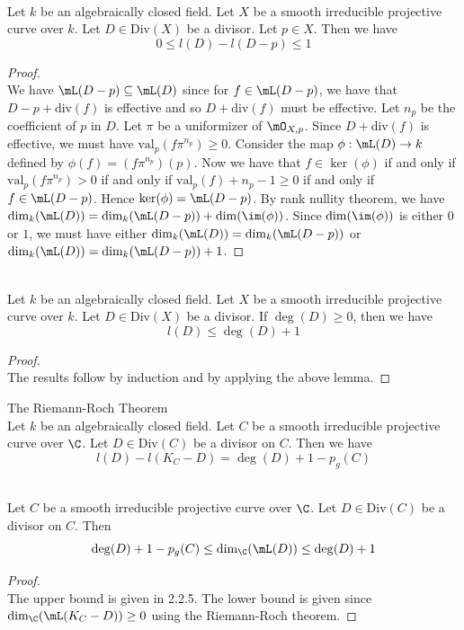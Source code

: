 \documentclass[a4paper]{article}
\begin{document}
\begin{lmm}{}{}\\
Let $k$ be an algebraically closed field. Let $X$ be a smooth irreducible projective curve over $k$. Let $D\in\text{Div}(X)$ be a divisor. Let $p\in X$. Then we have $$0\leq l(D)-l(D-p)\leq 1$$
\begin{proof}\\
We have $\mL(D-p)\subseteq\mL(D)$ since for $f\in\mL(D-p)$, we have that $D-p+\text{div}(f)$ is effective and so $D+\text{div}(f)$ must be effective. Let $n_p$ be the coefficient of $p$ in $D$. Let $\pi$ be a uniformizer of $\mO_{X,p}$. Since $D+\text{div}(f)$ is effective, we must have $\text{val}_p(f\pi^{n_p})\geq 0$. Consider the map $\phi:\mL(D)\to k$ defined by $\phi(f)=(f\pi^{n_p})(p)$. Now we have that $f\in\ker(\phi)$ if and only if $\text{val}_p(f\pi^{n_p})>0$ if and only if $\text{val}_p(f)+n_p-1\geq 0$ if and only if $f\in\mL(D-p)$. Hence $\ker(\phi)=\mL(D-p)$. By rank nullity theorem, we have $\dim_k(\mL(D))=\dim_k(\mL(D-p))+\dim(\im(\phi))$. Since $\dim(\im(\phi))$ is either $0$ or $1$, we must have either $\dim_k(\mL(D))=\dim_k(\mL(D-p))$ or $\dim_k(\mL(D))=\dim_k(\mL(D-p))+1$. 
\end{proof}
\end{lmm}

\begin{prp}{}{}\\
Let $k$ be an algebraically closed field. Let $X$ be a smooth irreducible projective curve over $k$. Let $D\in\text{Div}(X)$ be a divisor. If $\deg(D)\geq 0$, then we have $$l(D)\leq\deg(D)+1$$
\begin{proof}\\
The results follow by induction and by applying the above lemma. 
\end{proof}
\end{prp}

\begin{thm}{The Riemann-Roch Theorem}{}\\
Let $k$ be an algebraically closed field. Let $C$ be a smooth irreducible projective curve over $\C$. Let $D\in\text{Div}(C)$ be a divisor on $C$. Then we have $$l(D)-l(K_C-D)=\deg(D)+1-p_g(C)$$
\end{thm}

\begin{prp}{}{}\\
Let $C$ be a smooth irreducible projective curve over $\C$. Let $D\in\text{Div}(C)$ be a divisor on $C$. Then $$\deg(D)+1-p_g(C)\leq\dim_\C(\mL(D))\leq\deg(D)+1$$
\begin{proof}\\
The upper bound is given in 2.2.5. The lower bound is given since $\dim_\C(\mL(K_C-D))\geq 0$ using the Riemann-Roch theorem. 
\end{proof}
\end{prp}
\end{document}
